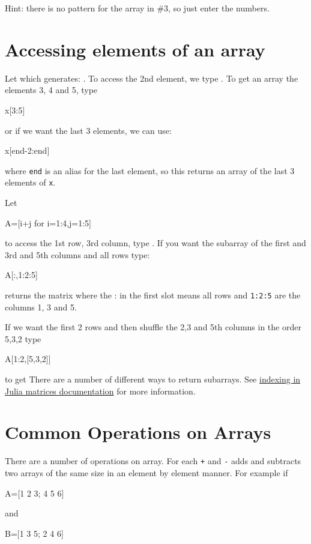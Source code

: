  Hint: there is no pattern for the array in \#3, so just enter the numbers.  

\hypertarget{accessing-elements-of-an-array}{%
\section{Accessing elements of an
array}\label{accessing-elements-of-an-array}}

Let  which generates:  \printpythontex[verb]. To access the 2nd element, we
type . To get an array the elements 3, 4 and 5, type
%
\begin{jlblock}[array]
x[3:5]
\end{jlblock}
%
or if we want the last 3 elements, we can use:
%
\begin{jlblock}[array]
x[end-2:end]
\end{jlblock}
%
where \texttt{end} is an alias for the last element, so this returns an array of the last 3 elements of \verb!x!.  

Let
%
\begin{jlblock}[array]
A=[i+j for i=1:4,j=1:5]
\end{jlblock}
%
to access the 1st row, 3rd column, type . If you want
the subarray of the first and 3rd and 5th columns and all rows type:
%
\begin{jlblock}[array]
A[:,1:2:5]
\end{jlblock}
%
returns the matrix  \printpythontex[verbatim]
%
where the : in the first slot means all rows and \texttt{1:2:5} are the
columns 1, 3 and 5.

If we want the first 2 rows and then shuffle the 2,3 and 5th columns in
the order 5,3,2 type

\begin{jlblock}[array]
A[1:2,[5,3,2]]
\end{jlblock}
to get  \printpythontex[verbatim]
%
There are a number of different ways to return subarrays. See
\href{https://docs.julialang.org/en/latest/manual/arrays/#man-array-indexing-1}{indexing
in Julia matrices documentation} for more information.


\section{Common Operations on Arrays}

There are a number of operations on array. For each \texttt{+} and \texttt{-} adds and subtracts two arrays of the same size in an element by element manner. For example if
%
\begin{jlblock}[array]
A=[1 2 3; 4 5 6]
\end{jlblock}
%
and
%
\begin{jlblock}[array]
B=[1 3 5; 2 4 6]
\end{jlblock}

